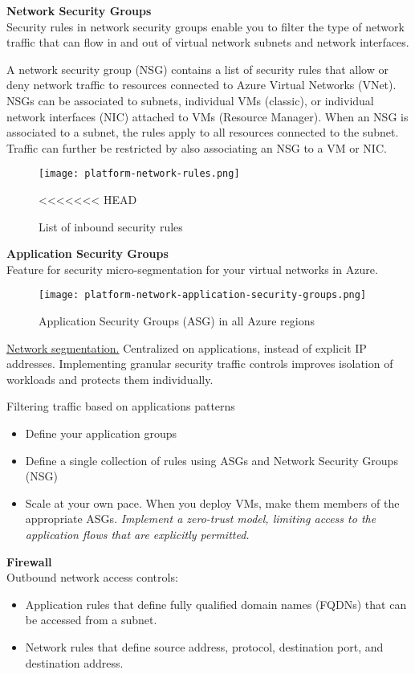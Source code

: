 \textbf{Network Security Groups} \\
Security rules in network security groups enable you to filter the type of network traffic that can flow in and out of virtual network subnets and network interfaces.

A network security group (NSG) contains a list of security rules that allow or deny network traffic to resources connected to Azure Virtual Networks (VNet). NSGs can be associated to subnets, individual VMs (classic), or individual network interfaces (NIC) attached to VMs (Resource Manager).  When an NSG is associated to a subnet, the rules apply to all resources connected to the subnet. Traffic can further be restricted by also associating an NSG to a VM or NIC.

\begin{figure}[!h]
\texttt{[image: platform-network-rules.png]}
\caption{List of inbound security rules}
<<<<<<< HEAD
\end{figure}


\textbf{Application Security Groups} \\
Feature for security micro-segmentation for your virtual networks in Azure.
\begin{figure}[!h]
\texttt{[image: platform-network-application-security-groups.png]}
\caption{Application Security Groups (ASG) in all Azure regions}
\end{figure}

\underline{Network segmentation.} Centralized on applications, instead of explicit IP addresses. Implementing granular security traffic controls improves isolation of workloads and protects them individually. 

Filtering traffic based on applications patterns
\begin{itemize}
\item Define your application groups
\item Define a single collection of rules using ASGs and Network Security Groups (NSG)
\item Scale at your own pace. When you deploy VMs, make them members of the appropriate ASGs. \textit{Implement a zero-trust model, limiting access to the application flows that are explicitly permitted.}
\end{itemize}

\textbf{Firewall} \\
Outbound network access controls:
\begin{itemize}
\item Application rules that define fully qualified domain names (FQDNs) that can be accessed from a subnet.
\item Network rules that define source address, protocol, destination port, and destination address.
\end{itemize}

